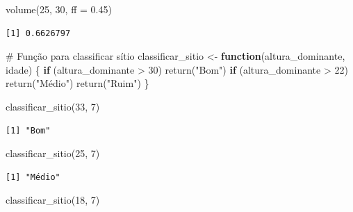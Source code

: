 \documentclass[
  letterpaper,
]{scrbook}
\newenvironment{Shaded}{\begin{snugshade}}{\end{snugshade}}
\newcommand{\AttributeTok}[1]{\textcolor[rgb]{0.40,0.45,0.13}{#1}}
\newcommand{\CommentTok}[1]{\textcolor[rgb]{0.37,0.37,0.37}{#1}}
\newcommand{\ControlFlowTok}[1]{\textcolor[rgb]{0.00,0.23,0.31}{\textbf{#1}}}
\newcommand{\DecValTok}[1]{\textcolor[rgb]{0.68,0.00,0.00}{#1}}
\newcommand{\FloatTok}[1]{\textcolor[rgb]{0.68,0.00,0.00}{#1}}
\newcommand{\FunctionTok}[1]{\textcolor[rgb]{0.28,0.35,0.67}{#1}}
\newcommand{\NormalTok}[1]{\textcolor[rgb]{0.00,0.23,0.31}{#1}}
\newcommand{\OtherTok}[1]{\textcolor[rgb]{0.00,0.23,0.31}{#1}}
\newcommand{\SpecialCharTok}[1]{\textcolor[rgb]{0.37,0.37,0.37}{#1}}
\newcommand{\StringTok}[1]{\textcolor[rgb]{0.13,0.47,0.30}{#1}}
\begin{document}
\begin{Shaded}
\begin{Highlighting}[]
\FunctionTok{volume}\NormalTok{(}\DecValTok{25}\NormalTok{, }\DecValTok{30}\NormalTok{, }\AttributeTok{ff =} \FloatTok{0.45}\NormalTok{)}
\end{Highlighting}
\end{Shaded}

\begin{verbatim}
[1] 0.6626797
\end{verbatim}

\begin{Shaded}
\begin{Highlighting}[]
\CommentTok{\# Função para classificar sítio}
\NormalTok{classificar\_sitio }\OtherTok{\textless{}{-}} \ControlFlowTok{function}\NormalTok{(altura\_dominante, idade) \{}
  \ControlFlowTok{if}\NormalTok{ (altura\_dominante }\SpecialCharTok{\textgreater{}} \DecValTok{30}\NormalTok{) }\FunctionTok{return}\NormalTok{(}\StringTok{"Bom"}\NormalTok{)}
  \ControlFlowTok{if}\NormalTok{ (altura\_dominante }\SpecialCharTok{\textgreater{}} \DecValTok{22}\NormalTok{) }\FunctionTok{return}\NormalTok{(}\StringTok{"Médio"}\NormalTok{)}
  \FunctionTok{return}\NormalTok{(}\StringTok{"Ruim"}\NormalTok{)}
\NormalTok{\}}

\FunctionTok{classificar\_sitio}\NormalTok{(}\DecValTok{33}\NormalTok{, }\DecValTok{7}\NormalTok{)}
\end{Highlighting}
\end{Shaded}

\begin{verbatim}
[1] "Bom"
\end{verbatim}

\begin{Shaded}
\begin{Highlighting}[]
\FunctionTok{classificar\_sitio}\NormalTok{(}\DecValTok{25}\NormalTok{, }\DecValTok{7}\NormalTok{)}
\end{Highlighting}
\end{Shaded}

\begin{verbatim}
[1] "Médio"
\end{verbatim}

\begin{Shaded}
\begin{Highlighting}[]
\FunctionTok{classificar\_sitio}\NormalTok{(}\DecValTok{18}\NormalTok{, }\DecValTok{7}\NormalTok{)}
\end{Highlighting}
\end{Shaded}
\end{document}
